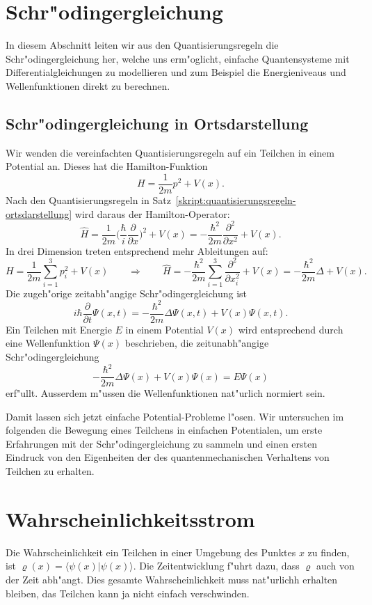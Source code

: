 \section{Schr"odingergleichung}
In diesem Abschnitt leiten wir aus den Quantisierungsregeln die
Schr"odingergleichung her, welche uns erm"oglicht, einfache
Quantensysteme mit Differentialgleichungen zu modellieren
und zum Beispiel die Energieniveaus und Wellenfunktionen direkt
zu berechnen.

\subsection{Schr"odingergleichung in Ortsdarstellung}
Wir wenden die vereinfachten Quantisierungsregeln auf ein
Teilchen in einem Potential an.
Dieses hat die Hamilton-Funktion
\[
H=\frac1{2m}p^2+V(x).
\]
Nach den Quantisierungsregeln in
Satz~\ref{skript:quantisierungsregeln-ortsdarstellung} wird daraus
der Hamilton-Operator:
\[
\hat H
=
\frac{1}{2m}\biggl(\frac{\hbar}{i}\frac{\partial }{\partial x}\biggr)^2
+V(x)
=
-\frac{\hbar^2}{2m}\frac{\partial^2}{\partial x^2}+V(x).
\]
In drei Dimension treten entsprechend mehr Ableitungen auf:
\[
H=\frac1{2m}\sum_{i=1}^3p_i^2+V(x)
\qquad\Rightarrow\qquad
\hat H
=
-\frac{\hbar^2}{2m}\sum_{i=1}^3\frac{\partial^2}{\partial x_i^2}+V(x)
=
-\frac{\hbar^2}{2m}\Delta + V(x).
\]
Die zugeh"orige zeitabh"angige Schr"odingergleichung ist
\[
i\hbar\frac{\partial}{\partial t}\Psi(x,t)
=
-\frac{\hbar^2}{2m}\Delta\Psi(x,t) + V(x)\Psi(x,t).
\]
Ein Teilchen mit Energie $E$ in einem Potential $V(x)$ wird entsprechend
durch eine Wellenfunktion $\Psi(x)$ beschrieben, die zeitunabh"angige
Schr"odingergleichung
\[
-\frac{\hbar^2}{2m}\Delta\Psi(x) + V(x)\Psi(x)
=
E\Psi(x)
\]
erf"ullt.
Ausserdem m"ussen die Wellenfunktionen nat"urlich normiert sein.

Damit lassen sich jetzt einfache Potential-Probleme l"osen.
Wir untersuchen im folgenden die Bewegung eines Teilchens in einfachen
Potentialen, um erste Erfahrungen mit der Schr"odingergleichung
zu sammeln und einen ersten Eindruck von den Eigenheiten der
des quantenmechanischen Verhaltens von Teilchen zu erhalten.




\section{Wahrscheinlichkeitsstrom}
Die Wahrscheinlichkeit ein Teilchen in einer Umgebung des
Punktes $x$ zu finden, ist $\varrho(x)=\langle \psi(x)|\psi(x)\rangle$.
Die Zeitentwicklung f"uhrt dazu, dass $\varrho$ auch von der
Zeit abh"angt.
Dies gesamte Wahrscheinlichkeit muss nat"urlichh erhalten bleiben,
das Teilchen kann ja nicht einfach verschwinden.

